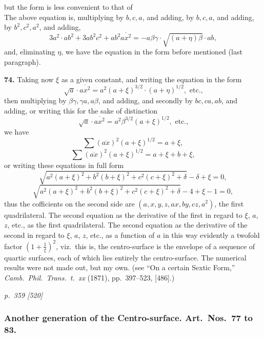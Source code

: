\documentclass[11pt,a4paper]{article}
\theoremstyle{plain}
\theoremstyle{definition}
\begin{document}
but the form is less convenient to that of \\
The above equation is, multiplying by $b, c, a$, and adding, by $b, c, a$, and adding, by $b^2, c^2, a^2$, and adding,
\[
3a^2 \cdot ab^2 + 3a b^2 c^2 + a b^2 \overline{a x^2} = - a \beta \gamma \cdot \sqrt{(a + \eta) \beta} \cdot ab,
\]
and, eliminating $\eta$, we have the equation in the form before mentioned (last paragraph).

\textbf{74.} Taking now $\xi$ as a given constant, and writing the equation in the form
\[
\sqrt{a} \cdot \overline{a x^2} = a^2 (a + \xi)^{3/2} \cdot (a + \eta)^{1/2}, \text{ etc.,}
\]
then multiplying by $\beta \gamma, \gamma a, a \beta$, and adding, and secondly by $b c, c a, a b$, and adding, or writing this for the sake of distinction
\[
\sqrt{a} \cdot \overline{a x^2} = a^2 \beta^{3/2} (a + \xi)^{1/2}, \text{ etc.,}
\]
we have
\[
\sum (\overline{a x})^2 (a + \xi)^{1/2} = a + \xi,
\]
\[
\sum (\overline{a x})^2 (a + \xi)^{1/2} = a + \xi + b + \xi,
\]
or writing these equations in full form
\[
\sqrt{a^2 (a + \xi)^2 + b^2 (b + \xi)^2 + c^2 (c + \xi)^2 + \delta} - \delta + \xi = 0,
\]
\[
\sqrt{a^2 (a + \xi)^2 + b^2 (b + \xi)^2 + c^2 (c + \xi)^2 + \delta} - 4 + \xi - 1 = 0,
\]
thus the cofficients on the second side are $(a, x, y, z, ax, by, cz, a^2)$, the first quadrilateral. The second equation as the derivative of the first in regard to $\xi$, $a$, $z$, etc., as the first quadrilateral. The second equation as the derivative of the second in regard to $\xi$, $a$, $z$, etc., as a function of $a$ in this way evidently a twofold factor $\left(1 + \frac{1}{\xi}\right)^2$, viz.\ this is, the centro-surface is the envelope of a sequence of quartic surfaces, each of which lies entirely the centro-surface. The numerical results were not made out, but my own. (see ``On a certain Sextic Form,'' \textit{Camb.\ Phil.\ Trans.\ t.\ xx} (1871), pp.\ 397--523, [486].)

\clearpage

\bigskip
\textit{p.~359 [520]}
\smallskip

\subsubsection*{Another generation of the Centro-surface. Art.\ Nos.\ 77 to 83.}
\end{document}
